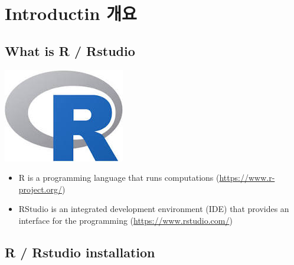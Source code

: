 \documentclass[]{book}
\providecommand{\tightlist}{%
  \setlength{\itemsep}{0pt}\setlength{\parskip}{0pt}}
\begin{document}
\hypertarget{introductin-}{%
\chapter{Introductin 개요}\label{introductin-}}

\hypertarget{what-is-r-rstudio}{%
\section{What is R / Rstudio}\label{what-is-r-rstudio}}

\includegraphics{images/r.jpg}

\begin{itemize}
\tightlist
\item
  R is a programming language that runs computations (\url{https://www.r-project.org/})
\item
  RStudio is an integrated development environment (IDE) that provides an interface for the programming (\url{https://www.rstudio.com/})
\end{itemize}

\hypertarget{r-rstudio-installation}{%
\section{R / Rstudio installation}\label{r-rstudio-installation}}
\end{document}
